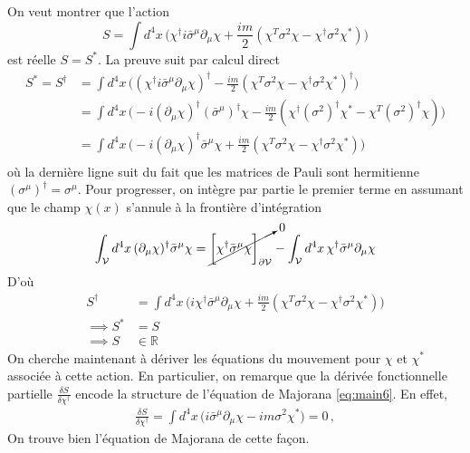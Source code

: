 \documentclass{article}
\numberwithin{equation}{section}
\theoremstyle{solution}
\begin{document}
\subsection{}
On veut montrer que l'action
\begin{equation}
        S = \int d^{4}x\, \bigg( \chi^{\dagger} i \bar{\sigma}^{\mu} \partial_\mu \chi + \frac{im}{2}(\chi^T \sigma^{2} \chi - \chi^{\dagger} \sigma^{2}\chi^{*}) \bigg)
\end{equation} 
est réelle $S = S^{*}$. La preuve suit par calcul direct
\begin{align*}
        S^{*} = S^{\dagger} &= 
        \int d^{4}x\, \bigg( (\chi^{\dagger} i \bar{\sigma}^{\mu} \partial_\mu \chi)^{\dagger} - \frac{im}{2}(\chi^T \sigma^{2} \chi - \chi^{\dagger} \sigma^{2}\chi^{*})^{\dagger} \bigg) \\
        &=  \int d^{4}x\, \bigg( -i (\partial_\mu \chi)^{\dagger}(\bar{\sigma}^{\mu})^{\dagger}\chi - \frac{im}{2}(\chi^{\dagger} (\sigma^{2})^{\dagger} \chi^{*} - \chi^{T} (\sigma^{2})^{\dagger}\chi) \bigg) \\
        &=  \int d^{4}x\, \bigg( -i (\partial_\mu \chi)^{\dagger}\bar{\sigma}^{\mu}\chi + \frac{im}{2}(\chi^{T} \sigma^{2}\chi -\chi^{\dagger} \sigma^{2}\chi^{*})\bigg) \\
\end{align*}
où la dernière ligne suit du fait que les matrices de Pauli sont hermitienne $(\sigma^{\mu})^{\dagger} = \sigma^{\mu}$.
Pour progresser, on intègre par partie le premier terme en assumant que le champ $\chi(x)$ s'annule à 
la frontière d'intégration
\begin{align*}
        \int_{\mathcal{V}} d^{4}x\,  (\partial_\mu \chi)^{\dagger}\bar{\sigma}^{\mu}\chi = \cancelto{0}{\bigg[\chi^{\dagger} \bar{\sigma}^{\mu} \chi \bigg]_{\partial\mathcal{V}}} - 
        \int_{\mathcal{V}} d^{4}x\, \chi^{\dagger} \bar{\sigma}^{\mu} \partial_\mu \chi 
\end{align*}
D'où
\begin{align*}
        S^{\dagger} &= \int d^{4}x\, \bigg( i \chi^{\dagger} \bar{\sigma}^{\mu} \partial_\mu \chi + \frac{im}{2}(\chi^{T} \sigma^{2}\chi -\chi^{\dagger} \sigma^{2}\chi^{*})\bigg) \\
        \implies S^{*} &=  S \\
        \implies S &\in \mathbb{R}
\end{align*}
On cherche maintenant à dériver les équations du mouvement pour $\chi$ et $\chi^{*}$ associée à cette action. 
En particulier, on remarque que la dérivée fonctionnelle partielle $\frac{\delta S}{\delta \chi^{\dagger}}$ encode 
la structure de l'équation de Majorana \eqref{eq:main6}. En effet,
\begin{align*}
        \frac{\delta S}{\delta \chi^{\dagger}} = \int d^{4}x\, 
        \big(i \bar{\sigma}^{\mu} \partial_\mu \chi - im\sigma^{2}\chi^{*} \big) = 0\, ,
\end{align*}
On trouve bien l'équation de Majorana de cette façon.
\end{document}
